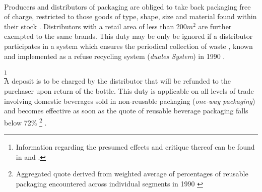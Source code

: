 \begin{description}[format={\storedescriptionlabel}]
	\item[Obligation to take back packaging]
	\hfill \\
	Producers and distributors of packaging are obliged to take back packaging free of charge, restricted to those goods of type, shape, size and material found within their stock \cite[§§~4-6]{verpackV1991}. Distributors with a retail area of less than 200$m^2$ are further exempted to the same brands. This duty may be only be ignored if a distributor participates in a system which ensures the periodical collection of waste \cite[§~6]{verpackV1991}, known and implemented as a refuse recycling system (\textit{duales System}) in 1990 \cite[p.~3]{Hartlep2011Recycling}.
	\item[Obligation to levy deposits on \gls{beverage packaging}\label{itm:levyDepositObligation}] \footnote{Information regarding the presumed effects and critique thereof can be found in \cite[p.~630]{Cora2000} and \cite{wacker2008pflichtpfand}.}
	\hfill \\
	A deposit is to be charged by the distributor that will be refunded to the purchaser upon return of the bottle. This duty is applicable on all levels of trade involving domestic beverages sold in non-\gls{reusable packaging} (\textit{one-way packaging}) \cite[§~7]{verpackV1991} and becomes effective as soon as the quote of reusable beverage packaging falls below 72\% \footnote{Aggregated quote derived from weighted average of percentages of reusable packaging encountered across individual segments in 1990 \cite[§~9]{verpackV1991} \cite[p.~134]{Rummler/Schutt1991}} \cite[§~9]{verpackV1991}.
\end{description}

